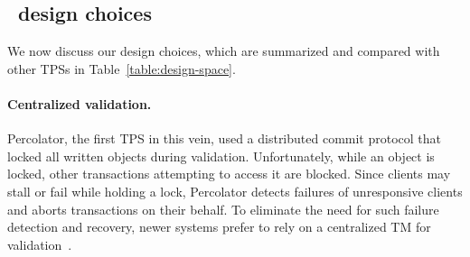
\subsection{\sys\ design choices}
\label{ssec:ll-txns}

We now discuss our design choices, which are summarized and compared with other TPSs in  Table~\ref{table:design-space}. 



\paragraph{Centralized validation.}

Percolator, the first TPS in this vein, used a distributed commit protocol that locked all written objects during validation. 
Unfortunately, while an object is locked, other transactions attempting to access it are blocked.
Since clients may stall or fail while holding a lock, Percolator detects failures of unresponsive 
clients and aborts transactions on their behalf. 
To eliminate the need for such failure detection and recovery, newer systems prefer to rely on 
a centralized TM for validation~\cite{OmidICDE2014,Omid2017,tephra}.


